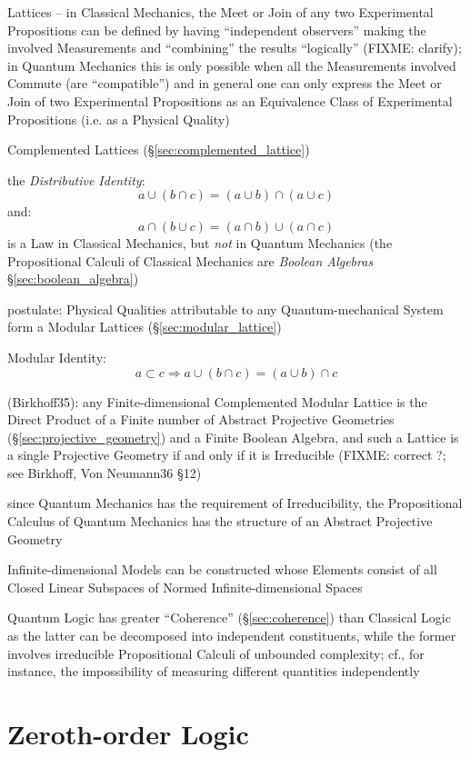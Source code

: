Lattices -- in Classical Mechanics, the Meet or Join of any two Experimental
Propositions can be defined by having ``independent observers'' making the
involved Measurements and ``combining'' the results ``logically'' (FIXME:
clarify); in Quantum Mechanics this is only possible when all the Measurements
involved Commute (are ``compatible'') and in general one can only express the
Meet or Join of two Experimental Propositions as an Equivalence Class of
Experimental Propositions (i.e. as a Physical Quality)

Complemented Lattices (\S\ref{sec:complemented_lattice})

the \emph{Distributive Identity}:
\[
  a \cup (b \cap c) = (a \cup b) \cap (a \cup c)
\]
and:
\[
  a \cap (b \cup c) = (a \cap b) \cup (a \cap c)
\]
is a Law in Classical Mechanics, but \emph{not} in Quantum Mechanics (the
Propositional Calculi of Classical Mechanics are \emph{Boolean Algebras}
\S\ref{sec:boolean_algebra})

postulate: Physical Qualities attributable to any Quantum-mechanical System form
a Modular Lattices (\S\ref{sec:modular_lattice})

Modular Identity:
\[
  a \subset c \Rightarrow a \cup (b \cap c) = (a \cup b) \cap c
\]

(Birkhoff35): any Finite-dimensional Complemented Modular Lattice is the Direct
Product of a Finite number of Abstract Projective Geometries
(\S\ref{sec:projective_geometry}) and a Finite Boolean Algebra, and such a
Lattice is a single Projective Geometry if and only if it is Irreducible
(FIXME: correct ?; see Birkhoff, Von Neumann36 \S 12)

since Quantum Mechanics has the requirement of Irreducibility, the Propositional
Calculus of Quantum Mechanics has the structure of an Abstract Projective
Geometry

Infinite-dimensional Models can be constructed whose Elements consist of all
Closed Linear Subspaces of Normed Infinite-dimensional Spaces

Quantum Logic has greater ``Coherence'' (\S\ref{sec:coherence}) than Classical
Logic as the latter can be decomposed into independent constituents, while the
former involves irreducible Propositional Calculi of unbounded complexity; cf.,
for instance, the impossibility of measuring different quantities independently



\section{Zeroth-order Logic}\label{sec:zerothorder_logic}

